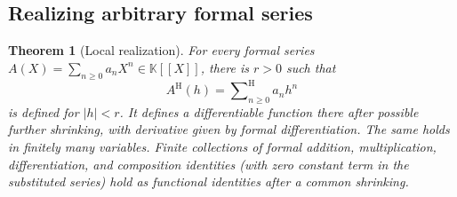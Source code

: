 \documentclass[11pt,oneside]{article}
\newtheorem{theorem}{Theorem}[section]
\theoremstyle{definition}\newtheorem{definition}[theorem]{Definition}
\newcommand{\K}{\mathbb K}
\newcommand{\Hsum}{\mathop{\sum}\nolimits^{\mathrm H}}
\newcommand{\htop}{\mathrm H}
\begin{document}
\subsection{Realizing arbitrary formal series}
\begin{theorem}[Local realization]\label{thm:realization}
For every formal series $A(X)=\sum_{n\geq0}a_nX^n\in\K[[X]]$, there is $r>0$ such that
\[
 A^{\htop}(h)=\Hsum_{n\geq0}a_nh^n
\]
is defined for $|h|<r$. It defines a differentiable function there after possible further shrinking, with derivative given by formal differentiation. The same holds in finitely many variables. Finite collections of formal addition, multiplication, differentiation, and composition identities (with zero constant term in the substituted series) hold as functional identities after a common shrinking.
\end{theorem}
\end{document}
